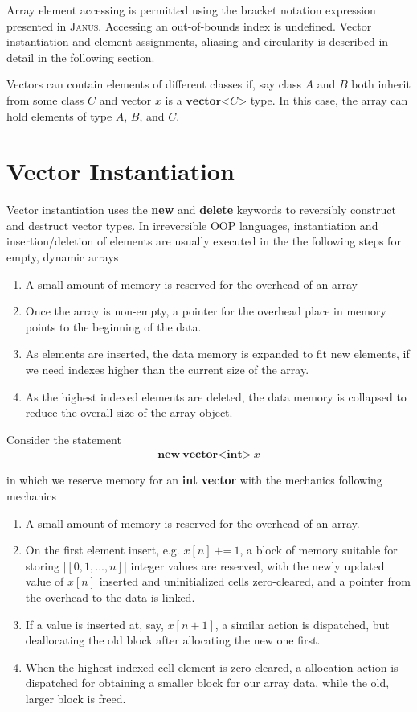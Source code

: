 Array element accessing is permitted using the bracket notation expression presented in \textsc{Janus}. Accessing an out-of-bounds index is undefined.
Vector instantiation and element assignments, aliasing and circularity is described in detail in the following section.

Vectors can contain elements of different classes if, say class $A$ and $B$ both inherit from some class $C$ and vector $x$ is a $\textbf{vector}\texttt{<}C\texttt{>}$ type. In this case, the array can hold elements of type $A$, $B$, and $C$.

\section{Vector Instantiation}
\label{sec:vector-instatiation}
Vector instantiation uses the \textbf{new} and \textbf{delete} keywords to reversibly construct and destruct vector types. In irreversible OOP languages,  instantiation and insertion/deletion of elements are usually executed in the the following steps for empty, dynamic arrays

\begin{enumerate}
\item A small amount of memory is reserved for the overhead of an array
\item Once the array is non-empty, a pointer for the overhead place in memory points to the beginning of the data.
\item As elements are inserted, the data memory is expanded to fit new elements, if we need indexes higher than the current size of the array.
\item As the highest indexed elements are deleted, the data memory is collapsed to reduce the overall size of the array object.
\end{enumerate}

Consider the statement
\begin{align*}
\textbf{new}\ \textbf{vector}\texttt{<}\textbf{int}\texttt{>}\ x
\end{align*} 

in which we reserve memory for an \textbf{int} \textbf{vector} with the mechanics following mechanics

\begin{enumerate}
\item A small amount of memory is reserved for the overhead of an array.
\item On the first element insert, e.g. $x[n]\ \texttt{+=}\ 1$, a block of memory suitable for storing $|[0, 1, ..., n]|$ integer values are reserved, with the newly updated value of $x[n]$ inserted and uninitialized cells zero-cleared, and a pointer from the overhead to the data is linked.
\item If a value is inserted at, say, $x[n+1]$, a similar action is dispatched, but deallocating the old block after allocating the new one first.
\item When the highest indexed cell element is zero-cleared, a allocation action is dispatched for obtaining a smaller block for our array data, while the old, larger block is freed.
\end{enumerate}

